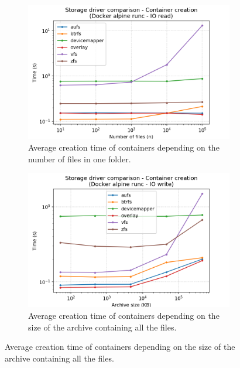 \begin{figure}[!h]
    \begin{subfigure}{.5\textwidth}
      \centering
      \includegraphics[width=\linewidth]{images/storage-driver/storage-driver-creation-Docker-alpine-runc---IO-read.png}
      \caption{Average creation time of containers depending on the number of files in one folder.}
      \label{fig:storage-driver:runc:io-read-create}
    \end{subfigure}
    \begin{subfigure}{.5\textwidth}
      \centering
      \includegraphics[width=\linewidth]{images/storage-driver/storage-driver-creation-Docker-alpine-runc---IO-write.png}
      \caption{Average creation time of containers depending on the size of the archive containing all the files.}
      \label{fig:storage-driver:runc:io-write-create}
    \end{subfigure}
    

\end{figure}
